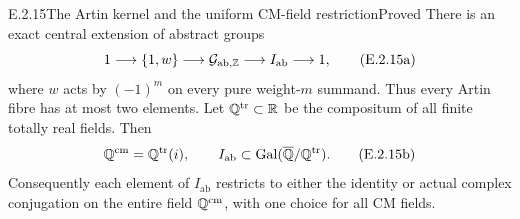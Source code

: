 \begin{result}{E.2.15}{The Artin kernel and the uniform CM-field restriction}{Proved}
There is an exact central extension of abstract groups
\[
 1\longrightarrow\{1,w\}\longrightarrow
 \mathcal G_{\mathrm{ab},\mathbb Z}\longrightarrow I_{\mathrm{ab}}
 \longrightarrow1,
 \tag{E.2.15a}
\]
where \(w\) acts by \((-1)^m\) on every pure weight-\(m\)
summand. Thus every Artin fibre has at most two elements.
Let \(\mathbb Q^{\mathrm{tr}}\subset\mathbb R\) be the compositum of all
finite totally real fields. Then
\[
 \mathbb Q^{\mathrm{cm}}=\mathbb Q^{\mathrm{tr}}(i),\qquad
 I_{\mathrm{ab}}\subset\operatorname{Gal}(\overline{\mathbb Q}/\mathbb Q^{\mathrm{tr}}).
 \tag{E.2.15b}
\]
Consequently each element of \(I_{\mathrm{ab}}\) restricts to
either the identity or actual complex conjugation on the entire
field \(\mathbb Q^{\mathrm{cm}}\), with one choice for all CM fields.
\end{result}
